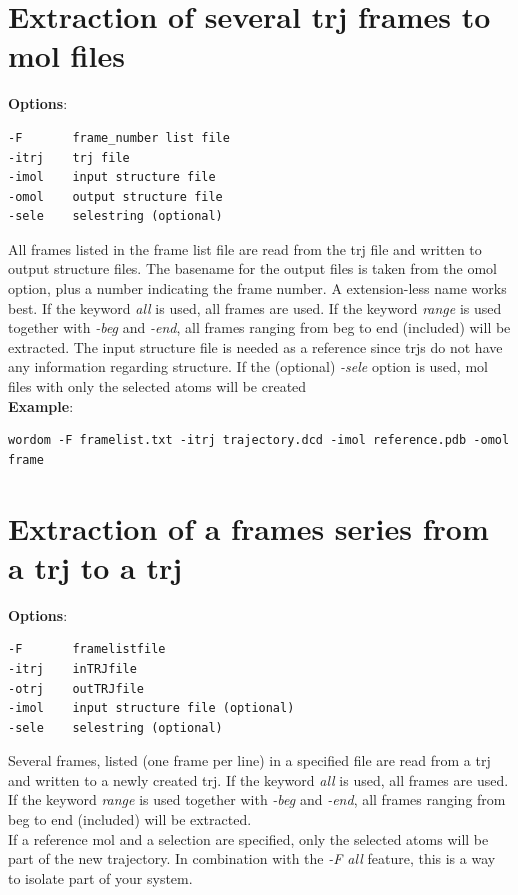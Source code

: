 \documentclass[11pt,twoside,onecolumn,a4paper,openright,notitlepage]{book}[2001/04/21]
\begin{document}
\section{Extraction of several trj frames to mol files}
\textbf{\large Options}:
\begin{verbatim}
-F       frame_number list file
-itrj    trj file
-imol    input structure file
-omol    output structure file
-sele    selestring (optional)
\end{verbatim}
All frames listed in the frame list file are read from the trj file and written to output structure files. The basename for the output files is taken from the omol option, plus a number indicating the frame number. A extension-less name works best. If the keyword \emph{all} is used, all frames are used. If the keyword \emph{range} is used together with \emph{-beg} and \emph{-end}, all frames ranging from beg to end (included) will be extracted. The input structure file is needed as a reference since trjs do not have any information regarding structure. If the (optional) \emph{-sele} option is used, mol files with only the selected atoms will be created\\

\textbf{\large Example}:
\begin{verbatim}
wordom -F framelist.txt -itrj trajectory.dcd -imol reference.pdb -omol frame
\end{verbatim}
%
\section{Extraction of a frames series from a trj to a trj}
\textbf{\large Options}:
\begin{verbatim}
-F       framelistfile
-itrj    inTRJfile
-otrj    outTRJfile     
-imol    input structure file (optional)
-sele    selestring (optional)
\end{verbatim}
Several frames, listed (one frame per line) in a specified file are read from a trj and written to a newly created trj. If the keyword \emph{all} is used, all frames are used. If the keyword \emph{range} is used together with \emph{-beg} and \emph{-end}, all frames ranging from beg to end (included) will be extracted.\\
If a reference mol and a selection are specified, only the selected atoms will be part of the new trajectory. In combination with the \emph{-F all} feature, this is a way to isolate part of your system.\\
\end{document}
